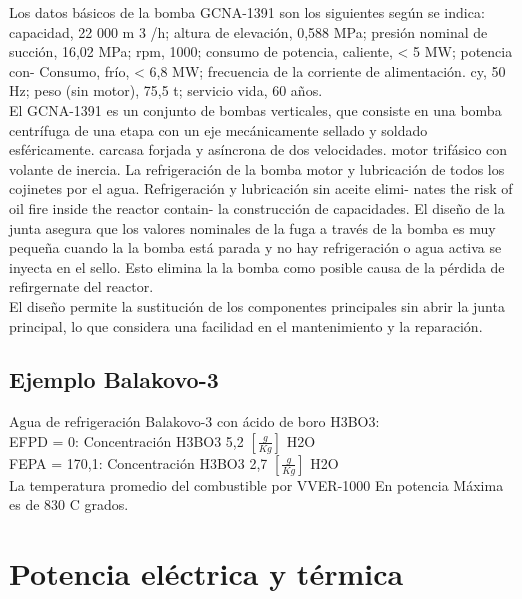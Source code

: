 \documentclass[]{article}
\begin{document}
Los datos básicos de la bomba GCNA-1391 son los siguientes
según se indica: capacidad, 22 000 m 3 /h; altura de elevación, 0,588 MPa;
presión nominal de succión, 16,02 MPa; rpm, 1000;
consumo de potencia, caliente, < 5 MW; potencia con-
Consumo, frío, < 6,8 MW; frecuencia de la corriente de alimentación.
cy, 50 Hz; peso (sin motor), 75,5 t; servicio
vida, 60 años.\\

 El GCNA-1391 es un conjunto de bombas verticales,
que consiste en una bomba centrífuga de una etapa con
un eje mecánicamente sellado y soldado esféricamente.
carcasa forjada y asíncrona de dos velocidades.
motor trifásico con volante de inercia. La refrigeración de la bomba
motor y lubricación de todos los cojinetes
por el agua. Refrigeración y lubricación sin aceite elimi-
nates the risk of oil fire inside the reactor contain-
la construcción de capacidades. El diseño de la junta asegura que los valores nominales de
la fuga a través de la bomba es muy pequeña cuando la
la bomba está parada y no hay refrigeración o agua activa
se inyecta en el sello. Esto elimina la
la bomba como posible causa de la pérdida de refirgernate del reactor.\\


El diseño permite la sustitución de los componentes principales
sin abrir la junta principal, lo que considera una facilidad en el mantenimiento y la reparación.\citep{Rosatom}\\

\subsection{Ejemplo Balakovo-3}

Agua de refrigeración Balakovo-3 con ácido de boro H3BO3:\\
EFPD = 0: Concentración H3BO3 5,2 $[\frac{g}{Kg}]$ H2O\\
FEPA = 170,1:  Concentración H3BO3 2,7 $[\frac{g}{Kg}]$ H2O\\

La temperatura promedio del combustible por VVER-1000 En potencia Máxima es de 830 C grados.\citep{Nea-1995}\\

\section{Potencia eléctrica y térmica}
\end{document}
